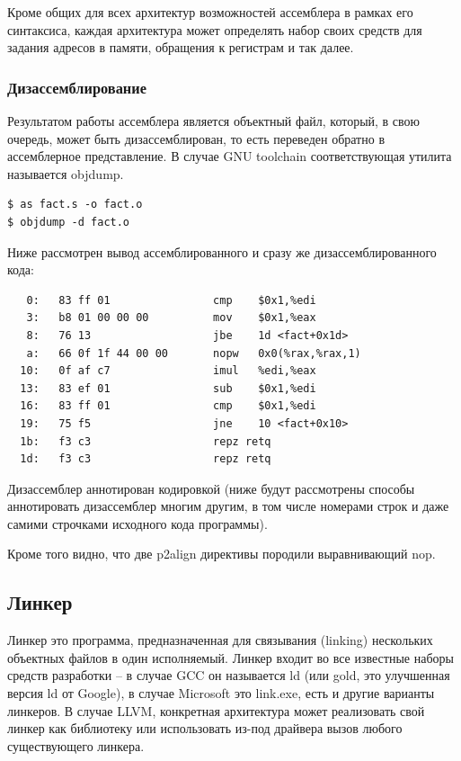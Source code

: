 \documentclass[a4paper,12pt,oneside]{article}
\begin{document}
Кроме общих для всех архитектур возможностей ассемблера в рамках его синтаксиса, каждая архитектура может определять набор своих средств для задания адресов в памяти, обращения к регистрам и так далее.

\subsubsection{Дизассемблирование}\label{subsubsec:Disasm}

Результатом работы ассемблера является объектный файл, который, в свою очередь, может быть дизассемблирован, то есть переведен обратно в ассемблерное представление. В случае GNU toolchain соответствующая утилита называется objdump. 

\begin{verbatim}
$ as fact.s -o fact.o
$ objdump -d fact.o
\end{verbatim}

Ниже рассмотрен вывод ассемблированного и сразу же дизассемблированного кода:

\begin{verbatim}
   0:	83 ff 01             	cmp    $0x1,%edi
   3:	b8 01 00 00 00       	mov    $0x1,%eax
   8:	76 13                	jbe    1d <fact+0x1d>
   a:	66 0f 1f 44 00 00    	nopw   0x0(%rax,%rax,1)
  10:	0f af c7             	imul   %edi,%eax
  13:	83 ef 01             	sub    $0x1,%edi
  16:	83 ff 01             	cmp    $0x1,%edi
  19:	75 f5                	jne    10 <fact+0x10>
  1b:	f3 c3                	repz retq 
  1d:	f3 c3                	repz retq 
\end{verbatim}

Дизассемблер аннотирован кодировкой (ниже будут рассмотрены способы аннотировать дизассемблер многим другим, в том числе номерами строк и даже самими строчками исходного кода программы).

Кроме того видно, что две p2align директивы породили выравнивающий nop.

\pagebreak
\subsection{Линкер}\label{subsec:Linker}

Линкер это программа, предназначенная для связывания (linking) нескольких объектных файлов в один исполняемый. Линкер входит во все известные наборы средств разработки -- в случае GCC он называется ld (или gold, это улучшенная версия ld от Google), в случае Microsoft это link.exe, есть и другие варианты линкеров. В случае LLVM, конкретная архитектура может реализовать свой линкер как библиотеку или использовать из-под драйвера вызов любого существующего линкера.
\end{document}
